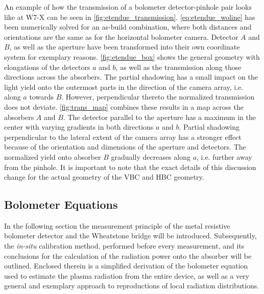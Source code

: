 %
            An example of how the transmission of a bolometer detector-pinhole pair looks like at W7-X can be seen in \cref{fig:etendue_transmission}. \autoref{eq:etendue_woline} has been numerically solved for an as-build combination, where both distances and orientations are the same as for the horizontal bolometer camera. Detector $A$ and $B$, as well as the aperture have been transformed into their own coordinate system for exemplary reasons. \autoref{fig:etendue_box} shows the general geometry with elongations of the detectors $a$ and $b$, as well as the transmission along those directions across the absorbers. The partial shadowing has a small impact on the light yield onto the outermost parts in the direction of the camera array, i.e. along $a$ towards $B$. However, perpendicular thereto the normalized transmission does not deviate. \autoref{fig:trans_map} combines these results in a map across the absorbers $A$ and $B$. The detector parallel to the aperture has a maximum in the center with varying gradients in both directions $a$ and $b$. Partial shadowing perpendicular to the lateral extent of the camera array has a stronger effect because of the orientation and dimensions of the aperture and detectors. The normalized yield onto absorber $B$ gradually decreases along $a$, i.e. further away from the pinhole. It is important to note that the exact details of this discussion change for the actual geometry of the VBC and HBC geometry.%
%
        \subsection{Bolometer Equations}\label{subsec:bolometerequations}%
%
            In the following section the measurement principle of the metal resistive bolometer detector and the Wheatstone bridge will be introduced. Subsequently, the \textit{in-situ} calibration method, performed before every measurement, and its conclusions for the calculation of the radiation power onto the absorber will be outlined. Enclosed therein is a simplified derivation of the bolometer equation used to estimate the plasma radiation from the entire device, as well as a very general and exemplary approach to reproductions of local radiation distributions.%
%
